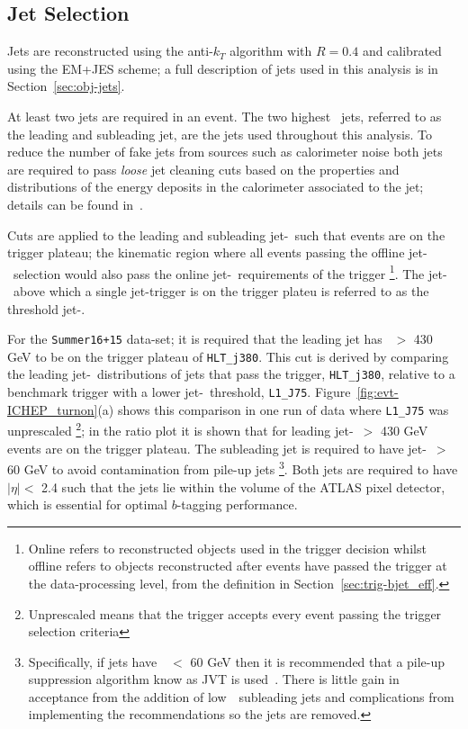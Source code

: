 \subsection{Jet Selection}
\label{sec:evt-sel-jets}

Jets are reconstructed using the anti-$k_T$ algorithm with $R=0.4$
and calibrated using the EM+JES scheme;
a full description of jets used in this analysis is in Section~\ref{sec:obj-jets}.

At least two jets are required in an event.
The two highest \pT~jets, referred to as the leading and subleading jet,
are the jets used throughout this analysis.
To reduce the number of fake jets from sources such as calorimeter noise
both jets are required to pass \textit{loose} jet cleaning cuts
based on the properties and distributions of the energy deposits in the calorimeter associated to the jet;
details can be found in~\cite{evt-jet_cleaning}.

Cuts are applied to the leading and subleading jet-\pT~such that events are on the trigger plateau;
the kinematic region where all events passing the offline jet-\pT~selection
would also pass the online jet-\pT~requirements of the trigger
\footnote{Online refers to reconstructed objects used in the trigger decision
  whilst offline refers to objects reconstructed after events have passed the trigger at the data-processing level,
  from the definition in Section~\ref{sec:trig-bjet_eff}.}.
The jet-\pT~above which a single jet-trigger is on the trigger plateu is referred to as the threshold jet-\pT.

For the \verb|Summer16+15| data-set; it is required that the leading jet has \pT~$>$ 430 GeV to be on the trigger plateau of \verb|HLT_j380|.
This cut is derived by comparing the leading jet-\pT~distributions of jets that pass the trigger, \verb|HLT_j380|,
relative to a benchmark trigger with a lower jet-\pT~threshold, \verb|L1_J75|.
Figure~\ref{fig:evt-ICHEP_turnon}(a) shows this comparison in one run of data where \verb|L1_J75| was unprescaled
\footnote{Unprescaled means that the trigger accepts every event passing the trigger selection criteria};
in the ratio plot it is shown that for leading jet-\pT~$>$ 430 GeV events are on the trigger plateau.
The subleading jet is required to have jet-\pT~$>$ 60 GeV
to avoid contamination from pile-up jets
\footnote{Specifically, if jets have~\pT~$<$ 60 GeV then it is recommended that
  a pile-up suppression algorithm know as JVT is used~\cite{evt-jvt}.
  There is little gain in acceptance from the addition of low~\pT~subleading jets and
  complications from implementing the recommendations so the jets are removed. }.
Both jets  are required to have $|\eta| <$ 2.4
such that the jets lie within the volume of the ATLAS pixel detector,
which is essential for optimal $b$-tagging performance.

